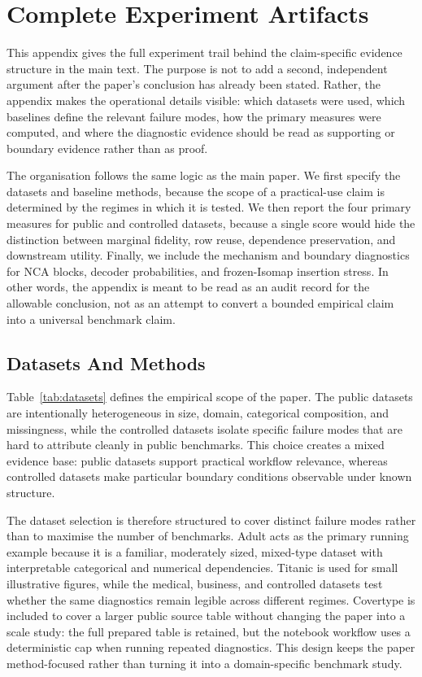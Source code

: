 \section{Complete Experiment Artifacts}
\label{app:experiments}

This appendix gives the full experiment trail behind the claim-specific
evidence structure in the main text. The purpose is not to add a second,
independent argument after the paper's conclusion has already been stated.
Rather, the appendix makes the operational details visible: which datasets were
used, which baselines define the relevant failure modes, how the primary
measures were computed, and where the diagnostic evidence should be read as
supporting or boundary evidence rather than as proof.

The organisation follows the same logic as the main paper. We first specify the
datasets and baseline methods, because the scope of a practical-use claim is
determined by the regimes in which it is tested. We then report the four primary
measures for public and controlled datasets, because a single score would hide
the distinction between marginal fidelity, row reuse, dependence preservation,
and downstream utility. Finally, we include the mechanism and boundary
diagnostics for NCA blocks, decoder probabilities, and frozen-Isomap insertion
stress. In other words, the appendix is meant to be read as an audit record for
the allowable conclusion, not as an attempt to convert a bounded empirical
claim into a universal benchmark claim.

\subsection{Datasets And Methods}

Table~\ref{tab:datasets} defines the empirical scope of the paper. The public
datasets are intentionally heterogeneous in size, domain, categorical
composition, and missingness, while the controlled datasets isolate specific
failure modes that are hard to attribute cleanly in public benchmarks. This
choice creates a mixed evidence base: public datasets support practical
workflow relevance, whereas controlled datasets make particular boundary
conditions observable under known structure.

The dataset selection is therefore structured to cover distinct failure modes
rather than to maximise the number of benchmarks. Adult acts as the primary
running example because it is a familiar, moderately sized, mixed-type dataset
with interpretable categorical and numerical dependencies. Titanic is used for
small illustrative figures, while the medical, business, and controlled
datasets test whether the same diagnostics remain legible across different
regimes. Covertype is included to cover a larger public source table without
changing the paper into a scale study: the full prepared table is retained, but
the notebook workflow uses a deterministic cap when running repeated
diagnostics. This design keeps the paper method-focused rather than turning it
into a domain-specific benchmark study.


